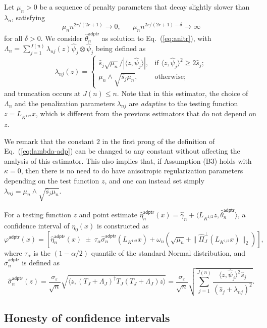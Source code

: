 \documentclass[11pt,a4paper]{article}
\renewcommand{\hat}{\widehat}
\theoremstyle{definition}
\theoremstyle{plain}
\theoremstyle{remark}
\newcommand{\adptr}{\mathsf{adptr}}
\begin{document}
Let $\mu_n>0$ be a sequence of penalty parameters that decay slightly slower than $\lambda_n$, satisfying
\begin{equation}
\mu_n n^{2r/(2r+1)}\to 0,\;\;\;\;\;\;\mu_n n^{2r/(2r+1)-\delta}\to\infty
\label{eq:mun}
\end{equation}
for all $\delta>0$.
We consider $\hat\theta_n^\adptr$ as solution to Eq.~(\ref{eq:anitr}), with $\Lambda_n=\sum_{j=1}^{J(n)}\lambda_{nj}(z)\hat\psi_j\otimes\hat\psi_j$ being defined as
\begin{equation}
\lambda_{nj}(z) = \left\{\begin{array}{ll}\hat s_j\sqrt{\mu_n}/|\langle z,\hat\psi_j\rangle|,&\text{if } \langle z,\hat\psi_j\rangle^2\geq 2\hat s_j;\\ \mu_n\wedge \sqrt{\hat s_j\mu_n},& \text{otherwise};\end{array}\right.
\label{eq:lambda-adp}
\end{equation}
and truncation occurs at $J(n)\leq n$.
Note that in this estimator, the choice of $\Lambda_n$ and the penalization parameters $\lambda_{nj}$ are \emph{adaptive} to the testing function $z=L_{K^{1/2}}x$,
which is different from the previous estimators that do not depend on $z$.

We remark that the constant $2$ in the first prong of the definition of Eq.~(\ref{eq:lambda-adp}) can be changed to any constant without affecting the analysis of this estimator.
This also implies that, if Assumption (B3) holds with $\kappa=0$, then there is no need to do have anisotropic regularization parameters depending on
the test function $z$, and one can instead set simply $\lambda_{nj}= \mu_n\wedge\sqrt{\hat s_j\mu_n}$.

For a testing function $z$ and point estimate $\hat\eta_n^\adptr(x)=\hat\gamma_n+\langle L_{K^{1/2}}z,\hat\theta_n^\adptr\rangle$, a confidence interval of $\eta_0(x)$ is constructed as
$$
\varphi^\adptr(x) = [\hat\eta_n^\adptr(x)\;\pm\;\tau_{\alpha}\hat\sigma_n^\adptr(L_{K^{1/2}}x)+\omega_n(\sqrt{\mu_n}+\|\hat\Pi_J^\perp(L_{K^{1/2}}x)\|_2)],
$$
where $\tau_{\alpha}$ is the $(1-\alpha/2)$ quantile of the standard Normal distribution, and $\hat\sigma_n^\adptr$ is defined as
$$
\hat\sigma_n^\adptr(z) =  \frac{\sigma_\varepsilon}{\sqrt{n}}\sqrt{\langle z, (T_J+\Lambda_J)^\dagger T_J(T_J+\Lambda_J)z\rangle} = \frac{\sigma_\varepsilon}{\sqrt{n}}\sqrt{\sum_{j=1}^{J(n)}\frac{\langle z,\hat\psi_j\rangle^2\hat s_j}{(\hat s_j+\lambda_{nj})^2}}.
$$

\subsection{Honesty of confidence intervals}
\end{document}
